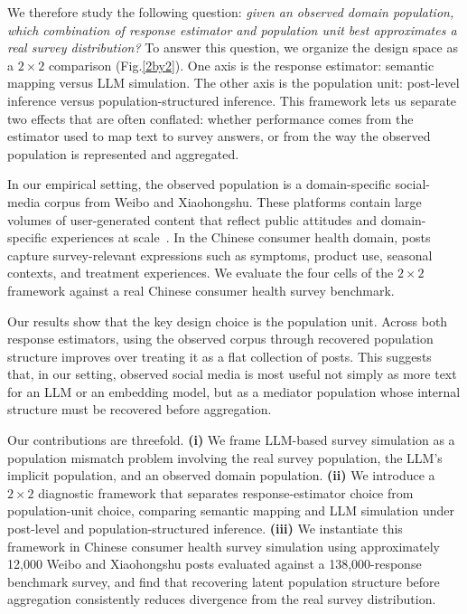 \documentclass{article}
\begin{document}
We therefore study the following question:
\textit{given an observed domain population, which combination of
response estimator and population unit best approximates a real survey
distribution?}
To answer this question, we organize the design space as a
$2\times2$ comparison (Fig.\ref{2by2}).
One axis is the response estimator:
semantic mapping versus LLM simulation.
The other axis is the population unit:
post-level inference versus population-structured inference.
This framework lets us separate two effects that are often conflated:
whether performance comes from the estimator used to map text to survey
answers, or from the way the observed population is represented and
aggregated.

In our empirical setting, the observed population is a domain-specific
social-media corpus from Weibo and Xiaohongshu.
These platforms contain large volumes of user-generated content that
reflect public attitudes and domain-specific experiences at
scale~\cite{wang2015forecasting, cerina2024ai}.
In the Chinese consumer health domain, posts capture survey-relevant
expressions such as symptoms, product use, seasonal contexts, and
treatment experiences.
We evaluate the four cells of the $2\times2$ framework against a real
Chinese consumer health survey benchmark.

Our results show that the key design choice is the population unit.
Across both response estimators, using the observed corpus through
recovered population structure improves over treating it as a flat
collection of posts.
This suggests that, in our setting, observed social media is most useful
not simply as more text for an LLM or an embedding model,
but as a mediator population whose internal structure must be recovered
before aggregation.

Our contributions are threefold.
\textbf{(i)} We frame LLM-based survey simulation as a population
mismatch problem involving the real survey population, the LLM's
implicit population, and an observed domain population.
\textbf{(ii)} We introduce a $2\times2$ diagnostic framework that
separates response-estimator choice from population-unit choice,
comparing semantic mapping and LLM simulation under post-level and
population-structured inference.
\textbf{(iii)} We instantiate this framework in Chinese consumer health
survey simulation using approximately 12,000 Weibo and Xiaohongshu posts
evaluated against a 138,000-response benchmark survey, and find that
recovering latent population structure before aggregation consistently
reduces divergence from the real survey distribution.
\end{document}
